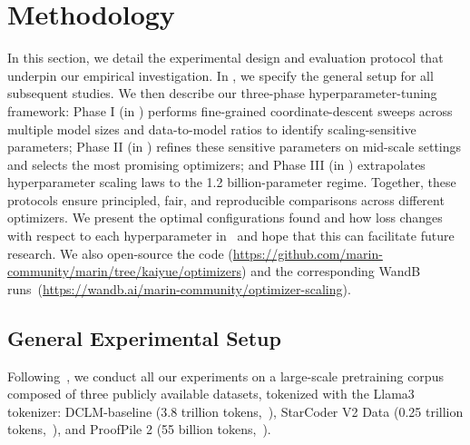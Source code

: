 \section{Methodology}


In this section, we detail the experimental design and evaluation protocol that underpin our empirical investigation. In , we specify the general setup for all subsequent studies. We then describe our three-phase hyperparameter-tuning framework: Phase I (in ) performs fine-grained coordinate-descent sweeps across multiple model sizes and data-to-model ratios to identify scaling-sensitive parameters; Phase II (in ) refines these sensitive parameters on mid-scale settings and selects the most promising optimizers; and Phase III (in ) extrapolates hyperparameter scaling laws to the 1.2 billion-parameter regime. Together, these protocols ensure principled, fair, and reproducible comparisons across different optimizers. We present the optimal configurations found and how loss changes with respect to each hyperparameter in~ and hope that this can facilitate future research. We also open-source the code (\url{https://github.com/marin-community/marin/tree/kaiyue/optimizers}) and the corresponding WandB runs\ (\url{https://wandb.ai/marin-community/optimizer-scaling}).

\subsection{General Experimental Setup}
\label{sec:experimental-setup}






Following~\cite{olmo20252olmo2furious}, we conduct all our experiments on a large-scale pretraining corpus composed of three publicly available datasets, tokenized with the Llama3 tokenizer: DCLM-baseline (3.8 trillion tokens,~\cite{li2025datacomplmsearchgenerationtraining}), StarCoder V2 Data (0.25 trillion tokens,~\cite{lozhkov2024starcoder2stackv2}), and ProofPile 2 (55 billion tokens,~\cite{azerbayev2024llemmaopenlanguagemodel}). 

